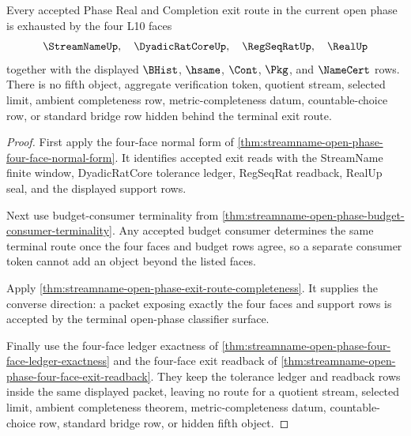 \begin{theorem}
\label{thm:streamname-open-phase-no-fifth-object-exhaustion}
Every accepted Phase Real and Completion exit route in the current open phase is exhausted by the four L10 faces
$$
\StreamNameUp,\quad \DyadicRatCoreUp,\quad \RegSeqRatUp,\quad \RealUp
$$
together with the displayed $\BHist$, $\hsame$, $\Cont$, $\Pkg$, and $\NameCert$ rows. There is no fifth object, aggregate verification token, quotient stream, selected limit, ambient completeness row, metric-completeness datum, countable-choice row, or standard bridge row hidden behind the terminal exit route.
\end{theorem}
\begin{proof}
First apply the four-face normal form of \autoref{thm:streamname-open-phase-four-face-normal-form}. It identifies accepted exit reads with the StreamName finite window, DyadicRatCore tolerance ledger, RegSeqRat readback, RealUp seal, and the displayed support rows.

Next use budget-consumer terminality from \autoref{thm:streamname-open-phase-budget-consumer-terminality}. Any accepted budget consumer determines the same terminal route once the four faces and budget rows agree, so a separate consumer token cannot add an object beyond the listed faces.

Apply \autoref{thm:streamname-open-phase-exit-route-completeness}. It supplies the converse direction: a packet exposing exactly the four faces and support rows is accepted by the terminal open-phase classifier surface.

Finally use the four-face ledger exactness of \autoref{thm:streamname-open-phase-four-face-ledger-exactness} and the four-face exit readback of \autoref{thm:streamname-open-phase-four-face-exit-readback}. They keep the tolerance ledger and readback rows inside the same displayed packet, leaving no route for a quotient stream, selected limit, ambient completeness theorem, metric-completeness datum, countable-choice row, standard bridge row, or hidden fifth object.
\end{proof}

